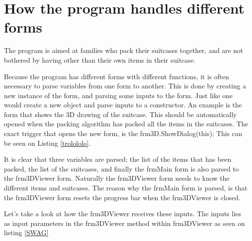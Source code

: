 \section{How the program handles different forms}
The program is aimed at families who pack their suitcases together, and are not bothered by having other than their own items in their suitcase. 

Because the program has different forms with different functions, it is often necessary to parse variables from one form to another. This is done by creating a new instance of the form, and parsing some inputs to the form. Just like one would create a new object and parse inputs to a constructor. An example is the form that shows the 3D drawing of the suitcase. This should be automatically opened when the packing algorithm has packed all the items in the suitcases. The exact trigger that opens the new form, is the frm3D.ShowDialog(this); This can be seen on Listing \ref{trolololo}. 


It is clear that three variables are parsed; the list of the items that has been packed, the list of the suitcases, and finally the frmMain form is also parsed to the frm3DViewer form. Naturally the frm3DViewer form needs to know the different items and suitcases. The reason why the frmMain form is parsed, is that the frm3DViewer form resets the progress bar when the frm3DViewer is closed. 

Let's take a look at how the frm3DViewer receives these inputs. The inputs lies as input parameters in the frm3DViewer method within frm3DViewer as seen on listing \ref{SWAG}

